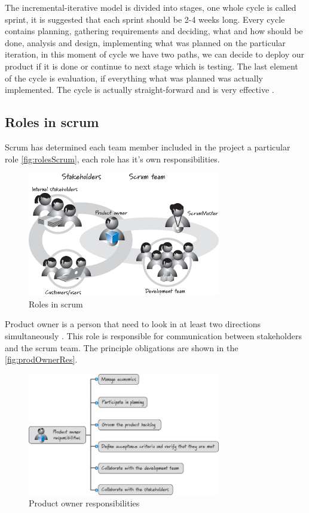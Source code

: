 The incremental-iterative model is divided into stages, one whole cycle is called sprint, it is suggested that each sprint should be 2-4 weeks long. Every cycle contains planning, gathering requirements and deciding, what and how should be done, analysis and design, implementing what was planned on the particular iteration, in this moment of cycle we have two paths, we can decide to deploy our product if it is done or continue to next stage which is testing. The last element of the cycle is evaluation, if everything what was planned was actually implemented. The cycle is actually straight-forward and is very effective \cite{ScrumBook}.

\subsection{Roles in scrum}
Scrum has determined each team member included in the project a particular role \autoref{fig:rolesScrum}, each role has it's own responsibilities.

\begin{figure}[h]
\caption{Roles in scrum \cite{ScrumBook}}
\label{fig:rolesScrum}
\centering
\includegraphics[width=0.75\textwidth]{img/roles}
\end{figure}

Product owner is a person that need to look in at least two directions simultaneously \cite{ScrumBook}. This role is responsible for communication between stakeholders and the scrum team. The principle obligations are shown in the \autoref{fig:prodOwnerRes}.

\begin{figure}[h]
\caption{Product owner responsibilities \cite{ScrumBook}}
\label{fig:prodOwnerRes}
\centering
\includegraphics[width=0.75\textwidth]{img/prodRes}
\end{figure}

